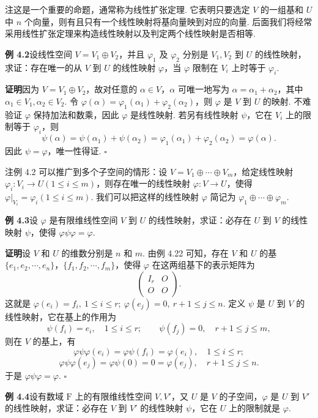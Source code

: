 \documentclass[UTF8,12pt,a4paper,fontset=fandol]{ctexart}
\begin{document}
注\quad 这是一个重要的命题，通常称为线性扩张定理. 它表明只要选定 $V$ 的一组基和 $U$ 中 $n$ 个向量，则有且只有一个线性映射将基向量映到对应的向量. 后面我们将经常采用线性扩张定理来构造线性映射以及判定两个线性映射是否相等.

\noindent\textbf{例 4.2}\quad 设线性空间 $V=V_1\oplus V_2$，并且 $\varphi_1$ 及 $\varphi_2$ 分别是 $V_1,V_2$ 到 $U$ 的线性映射，求证：存在唯一的从 $V$ 到 $U$ 的线性映射 $\varphi$，当 $\varphi$ 限制在 $V_i$ 上时等于 $\varphi_i$.

\noindent\textbf{证明}\quad 因为 $V=V_1\oplus V_2$，故对任意的 $\alpha\in V$，$\alpha$ 可唯一地写为 $\alpha=\alpha_1+\alpha_2$，其中 $\alpha_1\in V_1,\alpha_2\in V_2$. 令 $\varphi(\alpha)=\varphi_1(\alpha_1)+\varphi_2(\alpha_2)$，则 $\varphi$ 是 $V$ 到 $U$ 的映射. 不难验证 $\varphi$ 保持加法和数乘，因此 $\varphi$ 是线性映射. 若另有线性映射 $\psi$，它在 $V_i$ 上的限制等于 $\varphi_i$，则
\[
\psi(\alpha)=\psi(\alpha_1)+\psi(\alpha_2)=\varphi_1(\alpha_1)+\varphi_2(\alpha_2)=\varphi(\alpha).
\]
因此 $\psi=\varphi$，唯一性得证. $\square$

注\quad 例 4.2 可以推广到多个子空间的情形：设 $V=V_1\oplus\cdots\oplus V_m$，给定线性映射 $\varphi_i:V_i\to U(1\le i\le m)$，则存在唯一的线性映射 $\varphi:V\to U$，使得 $\varphi|_{V_i}=\varphi_i(1\le i\le m)$. 我们可以把这样的线性映射 $\varphi$ 简记为 $\varphi_1\oplus\cdots\oplus\varphi_m$.

\noindent\textbf{例 4.3}\quad 设 $\varphi$ 是有限维线性空间 $V$ 到 $U$ 的线性映射，求证：必存在 $U$ 到 $V$ 的线性映射 $\psi$，使得 $\varphi\psi\varphi=\varphi$.

\noindent\textbf{证明}\quad 设 $V$ 和 $U$ 的维数分别是 $n$ 和 $m$. 由例 4.22 可知，存在 $V$ 和 $U$ 的基 $\{e_1,e_2,\cdots,e_n\}$，$\{f_1,f_2,\cdots,f_m\}$，使得 $\varphi$ 在这两组基下的表示矩阵为
\[
\left(\begin{array}{cc}
I_r & O\\
O & O
\end{array}\right).
\]
这就是 $\varphi(e_i)=f_i,\ 1\le i\le r;\ \varphi(e_j)=0,\ r+1\le j\le n$. 定义 $\psi$ 是 $U$ 到 $V$ 的线性映射，它在基上的作用为
\[
\psi(f_i)=e_i,\quad 1\le i\le r;\qquad \psi(f_j)=0,\quad r+1\le j\le m,
\]
则在 $V$ 的基上，有
\[
\varphi\psi\varphi(e_i)=\varphi\psi(f_i)=\varphi(e_i),\quad 1\le i\le r;
\]
\[
\varphi\psi\varphi(e_j)=\varphi\psi(0)=0=\varphi(e_j),\quad r+1\le j\le n.
\]
于是 $\varphi\psi\varphi=\varphi$. $\square$

\noindent\textbf{例 4.4}\quad 设有数域 $\mathrm{F}$ 上的有限维线性空间 $V,V'$，又 $U$ 是 $V$ 的子空间，$\varphi$ 是 $U$ 到 $V'$ 的线性映射，求证：必存在 $V$ 到 $V'$ 的线性映射 $\psi$，它在 $U$ 上的限制就是 $\varphi$.
\end{document}
